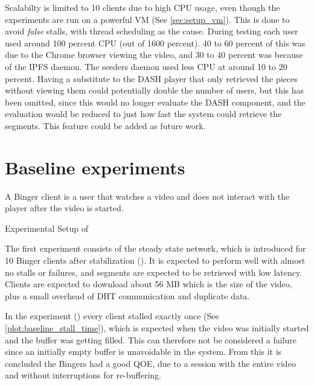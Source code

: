 Scalabilty is limited to 10 clients due to high CPU usage, even though the experiments are run on a powerful \ac{VM} (See \autoref{sec:setup_vm}). This is done to avoid \textit{false} stalls, with thread scheduling as the cause. During testing each user used around 100 percent CPU (out of 1600 percent). 40 to 60 percent of this was due to the Chrome browser viewing the video, and 30 to 40 percent was because of the \ac{IPFS} daemon. The seeders daemon used less CPU at around 10 to 20 percent. Having a substitute to the \ac{DASH} player that only retrieved the pieces without viewing them could potentially double the number of users, but this has been omitted, since this would no longer evaluate the \ac{DASH} component, and the evaluation would be reduced to just how fast the system could retrieve the segments. This feature could be added as future work.

\section{Baseline experiments}
\label{sec:eval_baseline}
A Binger client is a user that watches a video and does not interact with the player after the video is started.

\begin{table}[!htbp]
    \myfloatalign
    \caption[Experimental Setup of Baseline]{Experimental Setup of }
    \label{tab:exp_overview_baseline}
    
\end{table}

The first experiment consists of the steady state network, which is introduced for 10 Binger clients after stabilization (). It is expected to perform well with almost no stalls or failures, and segments are expected to be retrieved with low latency. Clients are expected to download about 56 \ac{MB} which is the size of the video, plus a small overhead of \ac{DHT} communication and duplicate data.

In the experiment () every client stalled exactly once (See \autoref{plot:baseline_stall_time}), which is expected when the video was initially started and the buffer was getting filled. This can therefore not be considered a failure since an initially empty buffer is unavoidable in the system. From this it is concluded the Bingers had a good \ac{QOE}, due to a session with the entire video and without interruptions for re-buffering.

\if{}

\fi

